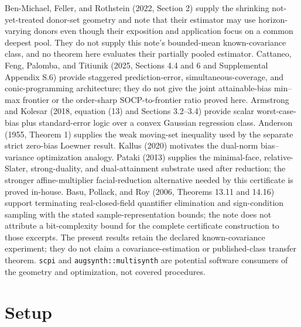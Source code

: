 \documentclass{article}
\begin{document}
Ben-Michael, Feller, and Rothstein (2022, Section 2) supply the shrinking not-yet-treated donor-set geometry and note that their estimator may use horizon-varying donors even though their exposition and application focus on a common deepest pool. They do not supply this note's bounded-mean known-covariance class, and no theorem here evaluates their partially pooled estimator. Cattaneo, Feng, Palomba, and Titiunik (2025, Sections 4.4 and 6 and Supplemental Appendix S.6) provide staggered prediction-error, simultaneous-coverage, and conic-programming architecture; they do not give the joint attainable-bias min--max frontier or the order-sharp SOCP-to-frontier ratio proved here. Armstrong and Kolesar (2018, equation (13) and Sections 3.2--3.4) provide scalar worst-case-bias plus standard-error logic over a convex Gaussian regression class. Anderson (1955, Theorem 1) supplies the weak moving-set inequality used by the separate strict zero-bias Loewner result. Kallus (2020) motivates the dual-norm bias--variance optimization analogy. Pataki (2013) supplies the minimal-face, relative-Slater, strong-duality, and dual-attainment substrate used after reduction; the stronger affine-multiplier facial-reduction alternative needed by this certificate is proved in-house. Basu, Pollack, and Roy (2006, Theorems 13.11 and 14.16) support terminating real-closed-field quantifier elimination and sign-condition sampling with the stated sample-representation bounds; the note does not attribute a bit-complexity bound for the complete certificate construction to those excerpts. The present results retain the declared known-covariance experiment; they do not claim a covariance-estimation or published-class transfer theorem. \texttt{scpi} and \texttt{augsynth::multisynth} are potential software consumers of the geometry and optimization, not covered procedures.

\section{Setup}
\end{document}
